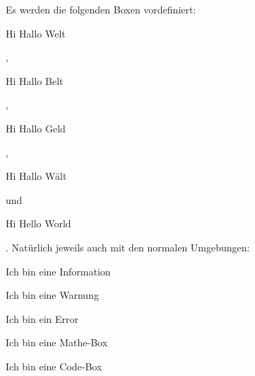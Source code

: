 Es werden die folgenden Boxen vordefiniert: \begin{infoBox*}{Hi}
    Hallo Welt
\end{infoBox*}, \begin{warningBox*}{Hi}
    Hallo Belt
\end{warningBox*}, \begin{errorBox*}{Hi}
    Hallo Geld
\end{errorBox*}, \begin{mathBox*}{Hi}
    Hallo Wält
\end{mathBox*} und \begin{codeBox*}{Hi}
    Hello World
\end{codeBox*}. Natürlich jeweils auch mit den normalen Umgebungen:
\begin{infoBox}{Ich bin eine Information}
    \lipsum[66]
\end{infoBox}
\begin{warningBox}{Ich bin eine Warnung}
    \lipsum[66]
\end{warningBox}
\begin{errorBox}{Ich bin ein Error}
    \lipsum[66]
\end{errorBox}
\begin{mathBox}{Ich bin eine Mathe-Box}
    \lipsum[66]
\end{mathBox}
\begin{codeBox}{Ich bin eine Code-Box}
    \lipsum[75]
\end{codeBox}


